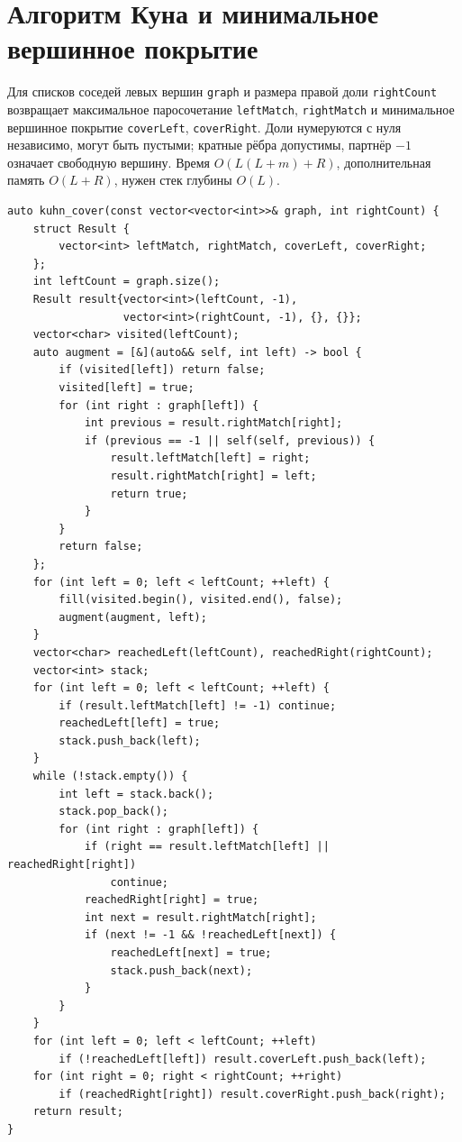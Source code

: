 \section{Алгоритм Куна и минимальное вершинное покрытие}
Для списков соседей левых вершин \texttt{graph} и размера правой доли \texttt{rightCount} возвращает максимальное паросочетание \texttt{leftMatch}, \texttt{rightMatch} и минимальное вершинное покрытие \texttt{coverLeft}, \texttt{coverRight}.
Доли нумеруются с нуля независимо, могут быть пустыми; кратные рёбра допустимы, партнёр $-1$ означает свободную вершину.
Время $O(L(L+m)+R)$, дополнительная память $O(L+R)$, нужен стек глубины $O(L)$.
\begin{lstlisting}[name=extra_graph_kuhn]
auto kuhn_cover(const vector<vector<int>>& graph, int rightCount) {
    struct Result {
        vector<int> leftMatch, rightMatch, coverLeft, coverRight;
    };
    int leftCount = graph.size();
    Result result{vector<int>(leftCount, -1),
                  vector<int>(rightCount, -1), {}, {}};
    vector<char> visited(leftCount);
    auto augment = [&](auto&& self, int left) -> bool {
        if (visited[left]) return false;
        visited[left] = true;
        for (int right : graph[left]) {
            int previous = result.rightMatch[right];
            if (previous == -1 || self(self, previous)) {
                result.leftMatch[left] = right;
                result.rightMatch[right] = left;
                return true;
            }
        }
        return false;
    };
    for (int left = 0; left < leftCount; ++left) {
        fill(visited.begin(), visited.end(), false);
        augment(augment, left);
    }
    vector<char> reachedLeft(leftCount), reachedRight(rightCount);
    vector<int> stack;
    for (int left = 0; left < leftCount; ++left) {
        if (result.leftMatch[left] != -1) continue;
        reachedLeft[left] = true;
        stack.push_back(left);
    }
    while (!stack.empty()) {
        int left = stack.back();
        stack.pop_back();
        for (int right : graph[left]) {
            if (right == result.leftMatch[left] || reachedRight[right])
                continue;
            reachedRight[right] = true;
            int next = result.rightMatch[right];
            if (next != -1 && !reachedLeft[next]) {
                reachedLeft[next] = true;
                stack.push_back(next);
            }
        }
    }
    for (int left = 0; left < leftCount; ++left)
        if (!reachedLeft[left]) result.coverLeft.push_back(left);
    for (int right = 0; right < rightCount; ++right)
        if (reachedRight[right]) result.coverRight.push_back(right);
    return result;
}
\end{lstlisting}
